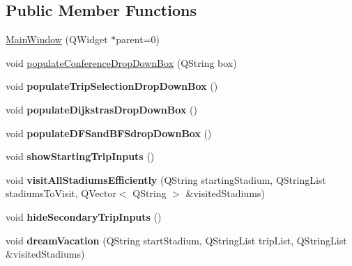 \subsection*{Public Member Functions}
\begin{DoxyCompactItemize}
\item 
\hyperlink{class_main_window_a8b244be8b7b7db1b08de2a2acb9409db}{Main\+Window} (Q\+Widget $\ast$parent=0)
\item 
void \hyperlink{class_main_window_adc0662d3cc64fcb561bfd6ac8b09726c}{populate\+Conference\+Drop\+Down\+Box} (Q\+String box)
\item 
\mbox{\label{class_main_window_a281137be7e79828fe96c4959c8b9ebe6}} 
void {\bfseries populate\+Trip\+Selection\+Drop\+Down\+Box} ()
\item 
\mbox{\label{class_main_window_a54af06c29e75a4fe491e006a20d9d90b}} 
void {\bfseries populate\+Dijkstras\+Drop\+Down\+Box} ()
\item 
\mbox{\label{class_main_window_a355c912d60d63c0c076658def96e6201}} 
void {\bfseries populate\+D\+F\+Sand\+B\+F\+Sdrop\+Down\+Box} ()
\item 
\mbox{\label{class_main_window_a505a2178bd2176455f98b784b328d3bf}} 
void {\bfseries show\+Starting\+Trip\+Inputs} ()
\item 
\mbox{\label{class_main_window_accf97cf25e538c019e1fe48910e35c95}} 
void {\bfseries visit\+All\+Stadiums\+Efficiently} (Q\+String starting\+Stadium, Q\+String\+List stadiums\+To\+Visit, Q\+Vector$<$ Q\+String $>$ \&visited\+Stadiums)
\item 
\mbox{\label{class_main_window_a72dc5e4404b2966dc03a3694a9cdfd21}} 
void {\bfseries hide\+Secondary\+Trip\+Inputs} ()
\item 
\mbox{\label{class_main_window_a77dac0add3c158454ce4b8b6e8579008}} 
void {\bfseries dream\+Vacation} (Q\+String start\+Stadium, Q\+String\+List trip\+List, Q\+String\+List \&visited\+Stadiums)
\end{DoxyCompactItemize}
